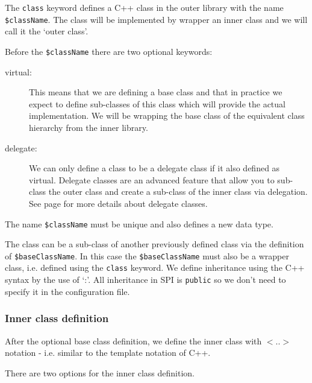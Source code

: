 The \texttt{class} keyword defines a C++ class in the outer library with the name \texttt{\$className}.
The class will be implemented by wrapper an inner class and we will call it the `outer class'.

Before the \texttt{\$className} there are two optional keywords:
\begin{description}
\item[virtual:] This means that we are defining a base class and that in practice we expect to define sub-classes of this class which will provide the actual implementation.
We will be wrapping the base class of the equivalent class hierarchy from the inner library.
\item[delegate:] We can only define a class to be a delegate class if it also defined as virtual.
Delegate classes are an advanced feature that allow you to sub-class the outer class and create a sub-class of the inner class via delegation. See page \pageref{delegateClass} for more details about delegate classes.
\end{description}

The name \texttt{\$className} must be unique and also defines a new data type.

The class can be a sub-class of another previously defined class via the definition of \texttt{\$baseClassName}.
In this case the \texttt{\$baseClassName} must also be a wrapper class, i.e. defined using the \texttt{class} keyword.
We define inheritance using the C++ syntax by the use of `:'.
All inheritance in SPI is \texttt{public} so we don't need to specify it in the configuration file.

\subsubsection*{Inner class definition} \label{innerClass}

After the optional base class definition, we define the inner class with $<..>$ notation - i.e. similar to the template notation of C++.

There are two options for the inner class definition.

